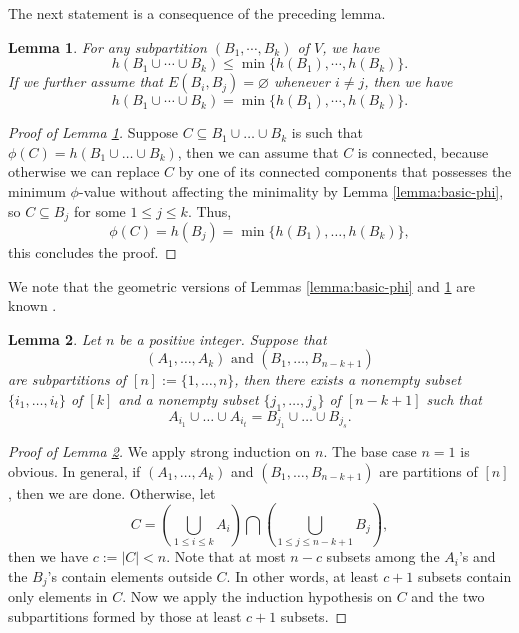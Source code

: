 \documentclass[12pt, reqno]{article}
\newtheorem{lemma}{Lemma}
\begin{document}
The next statement is a consequence of the preceding lemma.

\begin{lemma}\label{lem:cheeger-set-disjoint}
For any subpartition $(B_1,\cdots,B_k)$ of $V$, we have \[h(B_1\cup\cdots\cup B_k)\le \min\{h(B_1),\cdots,h(B_k)\}.\] If we further assume that $E(B_i,B_j)=\varnothing$ whenever $i\ne j$, then we have \[h(B_1\cup\cdots\cup B_k)=\min\{h(B_1),\cdots,h(B_k)\}.\]
\end{lemma}

\begin{proof}[Proof of Lemma \ref{lem:cheeger-set-disjoint}]
Suppose $C\subseteq B_1\cup\dots\cup B_k$ is such that $\phi(C)=h(B_1\cup\dots\cup B_k)$, then we can assume that $C$ is connected, because otherwise we can replace $C$ by one of its connected components that possesses the minimum $\phi$-value without affecting the minimality by Lemma \ref{lemma:basic-phi}, so $C\subseteq B_j$ for some $1\le j\le k$. Thus, \[\phi(C)=h(B_j)=\min\{h(B_1),\dots,h(B_k)\},\] this concludes the proof.
\end{proof}

We note that the geometric versions of Lemmas \ref{lemma:basic-phi} and \ref{lem:cheeger-set-disjoint} are known \cite{Bobkov-Parini,Mazon}. 

\begin{lemma}\label{lem:pigeonhole}
Let $n$ be a positive integer. Suppose that \[(A_1,\dots,A_k)\text{ and }(B_1,\dots,B_{n-k+1})\] are subpartitions of $[n]:=\{1,\dots, n\}$, then there exists a nonempty subset $\{i_1,\dots,i_t\}$ of $[k]$ and a nonempty subset $\{j_1,\dots,j_s\}$ of $[n-k+1]$ such that \[A_{i_1}\cup\dots\cup A_{i_t}=B_{j_1}\cup\dots\cup B_{j_s}.\]
\end{lemma}

\begin{proof}[Proof of Lemma \ref{lem:pigeonhole}]
We apply strong induction on $n$. The base case $n=1$ is obvious. In general, if $(A_1,\dots,A_k)$ and $(B_1,\dots,B_{n-k+1})$ are partitions of $[n]$, then we are done. Otherwise, let \[C=\left(\bigcup_{1\le i\le k} A_i\right)\bigcap\left(\bigcup_{1\le j\le n-k+1} B_j\right),\] then we have $c:=|C|<n$. Note that at most $n-c$ subsets among the $A_i$'s and the $B_j$'s contain elements outside $C$. In other words, at least $c+1$ subsets contain only elements in $C$. Now we apply the induction hypothesis on $C$ and the two subpartitions formed by those at least $c+1$ subsets.
\end{proof}
\end{document}
